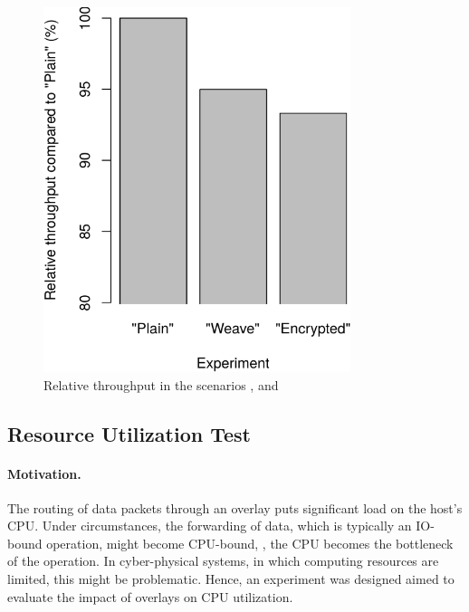 \begin{figure}[htpb]
  \centering
  \includegraphics[width=0.8\textwidth]{figures/throughput}
  \caption[Weave throughput benchmark results]{Relative throughput in the scenarios ,  and }\label{fig:throughput}
\end{figure}

%
%
%
%
%
%
%
%
%
%


\subsection{Resource Utilization Test} \label{sec:utilization}

\paragraph{Motivation.} The routing of data packets through an overlay puts significant load on the host's CPU. Under circumstances, the forwarding of data, which is typically an IO-bound operation, might become CPU-bound, \ie , the CPU becomes the bottleneck of the operation. In cyber-physical systems, in which computing resources are limited, this might be problematic. Hence, an experiment was designed aimed to evaluate the impact of overlays on CPU utilization.

